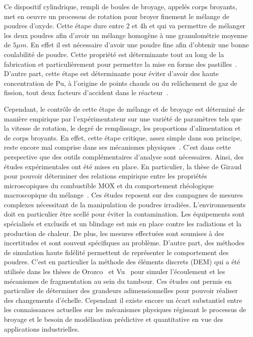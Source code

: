 Ce dispositif cylindrique, rempli de boules de broyage, appelés corps broyants, met en oeuvre un processus de rotation pour broyer finement le mélange de poudres d'oxyde. Cette étape dure entre 2 et 4h et qui va permettre de mélanger les deux poudres afin d'avoir un mélange homogène à une granulométrie moyenne de $5\mu m$. En effet il est nécessaire d'avoir une poudre fine afin d'obtenir une bonne coulabilité de poudre. Cette propriété est déterminante tout au long de la fabrication et particulièrement pour permettre la mise en forme des pastilles~\cite{ABE2012393}. D'autre part, cette étape est déterminante pour éviter d'avoir des haute concentration de Pu, à l'origine de points chauds ou du relâchement de gaz de fission, tout deux facteurs d'accident dans le réacteur~\cite{BOULORE201579, oudinet2015}.

Cependant, le contrôle de cette étape de mélange et de broyage est déterminé de manière empirique par l'expérimentateur sur une variété de paramètres tels que la vitesse de rotation, le degré de remplissage, les proportions d'alimentation et de corps broyants. En effet, cette étape critique, assez simple dans son principe, reste encore mal comprise dans ses mécanismes physiques~\cite{Austin1981,Brandao2020,Mankosa1986,Datta2002,Capece2014}. C'est dans cette perspective que des outils complémentaires d'analyse sont nécessaires. Ainsi, des études expérimentales ont été mises en place. En particulier, la thèse de Giraud pour pouvoir déterminer des relations empirique entre les propriétés microscopiques du combustible MOX et du comportement rhéologique macroscopique du mélange~\cite{giraud_analyse_2020}. Ces études reposent sur des campagnes de mesures complexes nécessitant de la manipulation de poudres irradiées. L'environnements doit en particulier être scellé pour éviter la contamination. Les équipements sont spécialisés et exclusifs et un blindage est mis en place contre les radiations et la production de chaleur. De plus, les mesures effectuées sont soumises à des incertitudes et sont souvent spécifiques au problème.
D'autre part, des méthodes de simulation haute fidélité permettent de représenter le comportement des poudres. C'est en particulier la méthode des éléments discrets (DEM) qui a été utilisée dans les thèses de Orozco~\cite{Orozco2019} et Vu~\cite{vu_quasi-static_2023} pour simuler l'écoulement et les mécanismes de fragmentation au sein du tambour. Ces études ont permis en particulier de déterminer des grandeurs adimensionnelles pour pouvoir réaliser des changements d'échelle. Cependant il existe encore un écart substantiel entre les connaissances actuelles sur les mécanismes physiques régissant le processus de broyage et le besoin de modélisation prédictive et quantitative en vue des applications industrielles.

